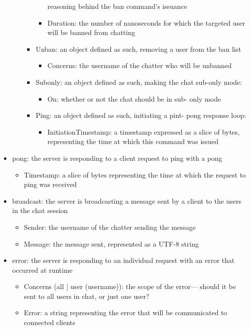 \documentclass{article}
\begin{document}
\begin{itemize}
\begin{itemize}
\begin{itemize}
\begin{itemize}
								reasoning behind the ban command's issuance
							\item Duration: the number of nanoseconds for which
								the targeted user will be banned from chatting
						\end{itemize}
					\item Unban: an object defined as such, removing a user
						from the ban list
						\begin{itemize}
							\item Concerns: the username of the chatter who will
								be unbanned
						\end{itemize}
					\item Subonly: an object defined as such, making the chat
						sub-only mode:
						\begin{itemize}
							\item On: whether or not the chat should be in sub-
								only mode
						\end{itemize}
					\item Ping: an object defined as such, initiating a pint-
						pong response loop:
						\begin{itemize}
							\item InitiationTimestamp: a timestamp expressed as
								a slice of bytes, representing the time at which
								this command was issued
						\end{itemize}
				\end{itemize}
		\end{itemize}
	\item pong: the server is responding to a client request to ping with a pong
		\begin{itemize}
			\item Timestamp: a slice of bytes representing the time at which
				the request to ping was received
		\end{itemize}
	\item broadcast: the server is broadcasting a message sent by a client to the
		users in the chat session
		\begin{itemize}
			\item Sender: the username of the chatter sending the message
			\item Message: the message sent, represented as a UTF-8 string
		\end{itemize}
	\item error: the server is responding to an individual request with an
		error that occurred at runtime
		\begin{itemize}
			\item Concerns (all | user (username)): the scope of the error---
				should it be sent to all users in chat, or just one user?
			\item Error: a string representing the error that will be
				communicated to connected clients
		\end{itemize}
\end{itemize}
\end{document}
